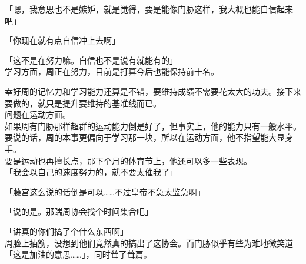 「嗯，我意思也不是嫉妒，就是觉得，要是能像门胁这样，我大概也能自信起来吧」

「你现在就有点自信冲上去啊」

「这不是在努力嘛。自信也不是说有就能有的」\\

学习方面，周正在努力，目前是打算今后也能保持前十名。

幸好周的记忆力和学习能力还算是不错，要维持成绩不需要花太大的功夫。接下来要做的，就只是提升要维持的基准线而已。\\

问题在运动方面。\\

如果周有门胁那样超群的运动能力倒是好了，但事实上，他的能力只有一般水平。要说的话，周的本事更偏向于学习那一块，所以在运动方面，他不指望能大显身手。\\

要是运动也再擅长点，那下个月的体育节上，他还可以多一些表现。\\

「我会以自己的速度努力的，就不要太催我了」

「藤宫这么说的话倒是可以……不过皇帝不急太监急啊」

「说的是。那踹周协会找个时间集合吧」

「讲真的你们搞了个什么东西啊」\\

周脸上抽筋，没想到他们竟然真的搞出了这协会。而门胁似乎有些为难地微笑道「这是加油的意思……」，同时耸了耸肩。
